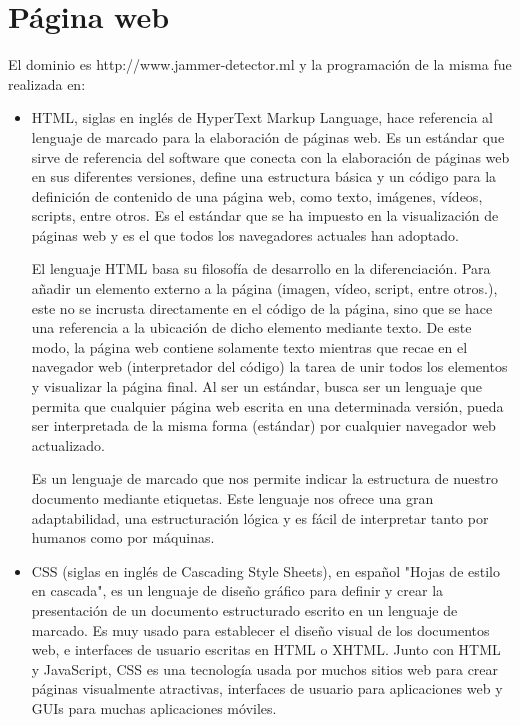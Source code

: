 \section{Página web}
El dominio es http://www.jammer-detector.ml y la programación de la misma fue realizada en:
\begin{itemize}
    \item HTML, siglas en inglés de HyperText Markup Language, hace referencia al lenguaje de marcado para la elaboración de páginas web. Es un estándar que 
sirve de referencia del software que conecta con la elaboración de páginas web en sus diferentes versiones, define una estructura básica y un código para la 
definición de contenido de una página web, como texto, imágenes, vídeos, scripts, entre otros. Es el estándar que se ha impuesto en la visualización de páginas 
web y es el que todos los navegadores actuales han adoptado.
    \par El lenguaje HTML basa su filosofía de desarrollo en la diferenciación. Para añadir un elemento externo a la página (imagen, vídeo, script, entre otros.), 
este no se incrusta directamente en el código de la página, sino que se hace una referencia a la ubicación de dicho elemento mediante texto. De este modo, la página 
web contiene solamente texto mientras que recae en el navegador web (interpretador del código) la tarea de unir todos los elementos y visualizar la página final. 
Al ser un estándar, busca ser un lenguaje que permita que cualquier página web escrita en una determinada versión, pueda ser interpretada de la misma forma (estándar)
 por cualquier navegador web actualizado.
    \par Es un lenguaje de marcado que nos permite indicar la estructura de nuestro documento mediante etiquetas. Este lenguaje nos ofrece una gran adaptabilidad, 
una estructuración lógica y es fácil de interpretar tanto por humanos como por máquinas.

    \item \par CSS (siglas en inglés de Cascading Style Sheets), en español "Hojas de estilo en cascada", es un lenguaje de diseño gráfico para definir y crear la 
presentación de un documento estructurado escrito en un lenguaje de marcado. Es muy usado para establecer el diseño visual de los documentos web, e interfaces de 
usuario escritas en HTML o XHTML. Junto con HTML y JavaScript, CSS es una tecnología usada por muchos sitios web para crear páginas visualmente atractivas, 
interfaces de usuario para aplicaciones web y GUIs para muchas aplicaciones móviles.


\end{itemize}

